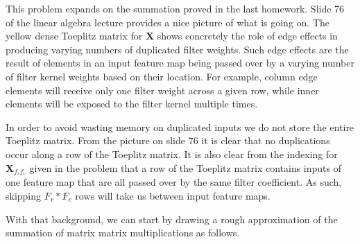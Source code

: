 \documentclass[11pt]{article}
\newcommand{\bs}{\boldsymbol}
\newcommand{\ifstringequal}[4]{%
  \ifnum\pdfstrcmp{#1}{#2}=0
  #3%
  \else
  #4%
  \fi
}
\begin{document}

\begin{solution}
	This problem expands on the summation proved in the last homework. Slide 76
	of the linear algebra lecture provides a nice picture of what is going on.
	The yellow dense Toeplitz matrix for $\bs{X}$ shows concretely the role of
	edge effects in producing varying numbers of duplicated filter weights.
	Such edge effects are the result of elements in an input feature map being
	passed over by a varying number of filter kernel weights based on their
	location. For example, column edge elements will receive only one filter
	weight across a given row, while inner elements will be exposed to the
	filter kernel multiple times.

	In order to avoid wasting memory on duplicated inputs we do not store the
	entire Toeplitz matrix. From the picture on slide 76 it is clear that
	no duplications occur along a row of the Toeplitz matrix. It is also clear
	from the indexing for $\bs{X}_{f_rf_c}$ given in the problem that a row of
	the Toeplitz matrix contains inputs of one feature map that are all passed
	over by the same filter coefficient. As such, skipping $F_r * F_c$ rows
	will take us between input feature maps.
	\newline

	With that background, we can start by drawing a rough approximation of the
	summation of matrix matrix multiplications as follows.




	\begin{figure}[H]
	\centering
\end{figure}
\end{solution}
\end{document}
